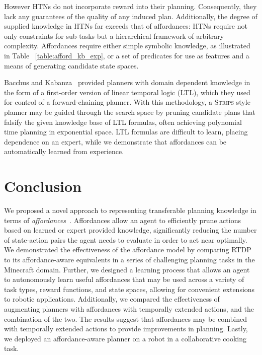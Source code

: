 \documentclass[letterpaper]{article}
\begin{document}
However HTNs do not incorporate reward into their
planning. Consequently, they lack any guarantees of the quality of any
induced plan.  Additionally, the degree of supplied knowledge in HTNs
far exceeds that of affordances: HTNs require not only constraints for
sub-tasks but a hierarchical framework of arbitrary
complexity. Affordances require either simple symbolic knowledge, as
illustrated in Table ~\ref{table:afford_kb_exp}, or a set of
predicates for use as features and a means of generating candidate
state spaces.


Bacchus and
Kabanza~\cite{Bacchus95usingtemporal,Bacchus99usingtemporal} provided
planners with domain dependent knowledge in the form of a first-order
version of linear temporal logic (LTL), which they used for control of
a forward-chaining planner. With this methodology, a \textsc{Strips}
style planner may be guided through the search space by pruning
candidate plans that falsify the given knowledge base of LTL formulas,
often achieving polynomial time planning in exponential space.  LTL
formulas are difficult to learn, placing dependence on an expert,
while we demonstrate that affordances can be automatically learned
from experience.



\section{Conclusion}
\label{sec:conclusion}
We proposed a novel approach to representing transferable planning
knowledge in terms of {\em affordances}~\cite{gibson77}. Affordances
allow an agent to efficiently prune actions based on learned or expert
provided knowledge, significantly reducing the number of state-action
pairs the agent needs to evaluate in order to act near optimally. We
demonstrated the effectiveness of the affordance model by comparing
RTDP to its affordance-aware equivalents in a series of challenging
planning tasks in the Minecraft domain. Further, we designed a
learning process that allows an agent to autonomously learn useful
affordances that may be used across a variety of task types, reward
functions, and state spaces, allowing for convenient extensions to
robotic applications.  Additionally, we compared the effectiveness of
augmenting planners with affordances with temporally extended actions,
and the combination of the two. The results suggest that affordances
may be combined with temporally extended actions to provide
improvements in planning.  Lastly, we deployed an affordance-aware
planner on a robot in a collaborative cooking task.
\end{document}
